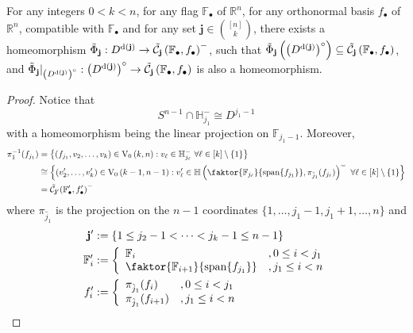 \begin{lemma}\label{lem:shub_dim} For any integers $0<k<n$, for any flag $\mathbb{F}_{\bullet}$ of $\mathbb{R}^n$, for any orthonormal basis $f_{\bullet}$ of $\mathbb{R}^n$, compatible with $\mathbb{F}_{\bullet}$ and for any set $\mathbf{j}\in\binom{[n]}{k}$, there exists a homeomorphism
$\tilde{\Phi}_{\mathbf{j}}:D^{\mathrm{d}(\mathbf{j})}\to\tilde{\mathcal{C}}_{\mathbf{j}}\left(\mathbb{F}_{\bullet},f_{\bullet}\right)^-$,
such that $\tilde{\Phi}_{\mathbf{j}}\left({\left(D^{\mathrm{d}(\mathbf{j})}\right)}^{\circ}\right)\subseteq\tilde{\mathcal{C}}_{\mathbf{j}}\left(\mathbb{F}_{\bullet},f_{\bullet}\right)$, and
$\tilde{\Phi}_{\mathbf{j}}|_{{\left(D^{\mathrm{d}(\mathbf{j})}\right)}^{\circ}}:{\left(D^{\mathrm{d}(\mathbf{j})}\right)}^{\circ}\to\tilde{\mathcal{C}}_{\mathbf{j}}\left(\mathbb{F}_{\bullet},f_{\bullet}\right)$
is also a homeomorphism.
\end{lemma}
\begin{proof}
Notice that
\begin{equation}\label{eq:linear_proj_disc}
S^{n-1}\cap\mathbb{H}_{j_1}^-\cong D^{j_1-1}
\end{equation}
with a homeomorphism being the linear projection on $\mathbb{F}_{j_1-1}$. Moreover,
\begin{align}
\begin{split}
\pi_1^{-1}(f_{j_1})&=\big\{(f_{j_1},v_2,\ldots,v_k)\in\StO{k}{n}:v_{\ell}\in\mathbb{H}_{j_{\ell}}^-\ \forall\ell\in[k]\setminus\{1\}\big\}\\
&\cong\Big\{(v'_2,\ldots,v'_k)\in\StO{k-1}{n-1}
:v'_{\ell}\in\mathbb{H}\left(\faktor{\mathbb{F}_{j_{\ell}}}{\spans\{f_{j_1}\}},\pi_{\hat{j}_1}(f_{j_{\ell}})\right)^-\ \forall\ell\in[k]\setminus\{1\}\Big\}\\
&=\tilde{\mathcal{C}}_{\mathbf{j}'}{\left(\mathbb{F}'_{\bullet},f'_{\bullet}\right)}^-
\end{split}\label{eq:induction_step}
\end{align}
where $\pi_{\hat{j}_1}$ is the projection on the $n-1$ coordinates $\{1,\ldots,j_1-1,j_1+1,\ldots,n\}$ and
\begin{align*}
\mathbf{j}'&:=\{1\leq j_2-1<\cdots<j_k-1\leq n-1\}\\
\mathbb{F}'_i&:=\left\{\begin{array}{ll}\mathbb{F}_i&,0\leq i<j_1\\\faktor{\mathbb{F}_{i+1}}{\spans\{f_{j_1}\}}&,j_1\leq i<n\end{array}\right.\\
f'_i&:=\left\{\begin{array}{ll}\pi_{\hat{j}_1}(f_i)&,0\leq i<j_1\\\pi_{\hat{j}_1}(f_{i+1})&,j_1\leq i<n\end{array}\right.

\end{align*}
\end{proof}
